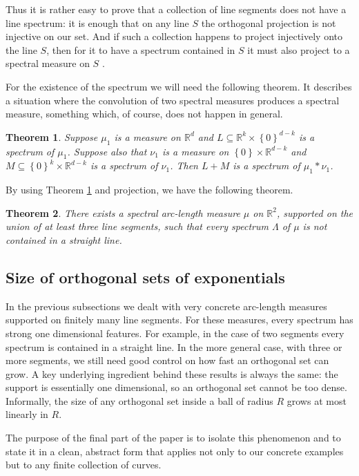 \documentclass[12pt,a4paper,intlimits,sumlimits]{amsart}
\theoremstyle{plain}
\newtheorem{theorem}{Theorem}
\theoremstyle{definition}
\newcommand{\Set}[1]{{\left\{{#1}\right\}}}
\newcommand{\RR}{{\mathbb R}}
\newcounter{rem}
\begin{document}
Thus it is rather easy to prove that a collection of line segments does not have a line spectrum: it is enough that on any line $S$ the orthogonal projection is not injective on our set. And if such a collection happens to project injectively onto the line $S$, then for it to have a spectrum contained in $S$ it must also project to a spectral measure on $S$ \cite[Theorem 1.2]{kolountzakis2025spectrality}.

For the existence of the spectrum we will need the following theorem. It describes a situation where the convolution of two spectral measures produces a spectral measure, something which, of course, does not happen in general.

\begin{theorem}\label{th:op}
Suppose $\mu_1$ is a measure on $\RR^d$ and $L \subseteq \RR^k\times\Set{0}^{d-k}$ is a spectrum of $\mu_1$. Suppose also that $\nu_1$ is a measure on $\Set{0}\times\RR^{d-k}$ and $M \subseteq \Set{0}^k\times\RR^{d-k}$ is a spectrum of $\nu_1$.
Then $L+M$ is a spectrum of $\mu_1*\nu_1$.
\end{theorem}

 By using Theorem \ref{th:op} and projection, we have the following theorem. 

\begin{theorem}\label{th:op-2}
There exists a  spectral arc-length measure $\mu$ on $\mathbb{R}^2$, supported on the union of at least three  line segments, such that every spectrum $\Lambda$ of $\mu$ is not contained in a straight  line.
\end{theorem}

\subsection{Size of orthogonal sets of exponentials}
In the previous subsections we  dealt  with very concrete arc-length measures supported on finitely many line segments. For these measures,  every spectrum has strong one dimensional features. For example, in the case of two segments every spectrum is contained in a straight line. In the more general case, with three or more segments, we still need good control on how fast an orthogonal set can grow.  A key underlying ingredient behind these results is always the same: the support is essentially one dimensional, so an orthogonal set cannot be too dense. Informally, the size of any orthogonal set inside a ball of radius $R$ grows at most linearly in $R$.

The purpose of the final part of the paper is to isolate this phenomenon and to state it in a clean, abstract form that applies not only to our concrete examples but to any finite collection  of curves. 
 
\end{document}
